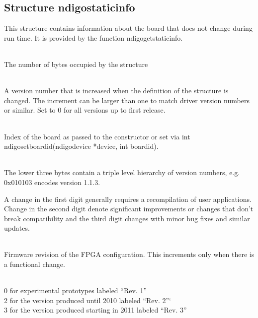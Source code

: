         \subsection{Structure ndigo\tu static\tu info}

            This structure contains information about the board that does not change during run time. It is provided by the function \textsf{ndigo\tu get\tu static\tu info}.\par

            \\
            The number of bytes occupied by the structure\par

            \\
            A version number that is increased when the definition of the structure is changed. The increment can be larger than one to match driver version numbers or similar. Set to 0 for all versions up to first release.\par

            \\
            Index of the board as passed to the constructor or set via \textsf{int ndigo\tu set\tu board\tu id(ndigo\tu device *device, int board\tu id)}.\par

            \\
            The lower three bytes contain a triple level hierarchy of version numbers, e.g. 0x010103 encodes version 1.1.3.\par

            A change in the first digit generally requires a recompilation of user applications. Change in the second digit denote significant improvements or changes that don't break compatibility and the third digit changes with minor bug fixes and similar updates.\par

            \\
            Firmware revision of the FPGA configuration. This increments only when there is a functional change.\par

            \\
            0 for experimental prototypes labeled ``Rev. 1''\\
            2 for the version produced until 2010 labeled ``Rev. 2''`\\
            3 for the version produced starting in 2011 labeled ``Rev. 3''\\

